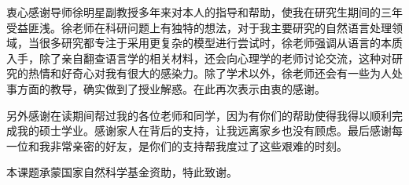 \begin{acknowledgement}

衷心感谢导师徐明星副教授多年来对本人的指导和帮助，使我在研究生期间的三年受益匪浅。徐老师在科研问题上有独特的想法，对于我主要研究的自然语言处理领域，当很多研究都专注于采用更复杂的模型进行尝试时，徐老师强调从语言的本质入手，除了亲自翻查语言学的相关材料，还会向心理学的老师讨论交流，这种对研究的热情和好奇心对我有很大的感染力。除了学术以外，徐老师还会有一些为人处事方面的教导，确实做到了授业解惑。在此再次表示由衷的感谢。

另外感谢在读期间帮过我的各位老师和同学，因为有你们的帮助使得我得以顺利完成我的硕士学业。感谢家人在背后的支持，让我远离家乡也没有顾虑。最后感谢每一位和我非常亲密的好友，是你们的支持帮我度过了这些艰难的时刻。



本课题承蒙国家自然科学基金资助，特此致谢。

\end{acknowledgement}
